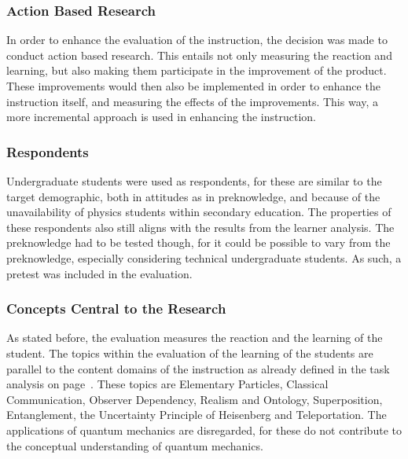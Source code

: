 \documentclass[11pt,twoside]{report} %
\begin{document}
\subsubsection{Action Based Research}

In order to enhance the evaluation of the instruction, the decision was made to conduct action based research. This entails not only measuring the reaction and learning, but also making them participate in the improvement of the product. These improvements would then also be implemented in order to enhance the instruction itself, and measuring the effects of the improvements. This way, a more incremental approach is used in enhancing the instruction.

\subsubsection{Respondents}

Undergraduate students were used as respondents, for these are similar to the target demographic, both in attitudes as in preknowledge, and because of the unavailability of physics students within secondary education. The properties of these respondents also still aligns with the results from the learner analysis. The preknowledge had to be tested though, for it could be possible to vary from the preknowledge, especially considering technical undergraduate students. As such, a pretest was included in the evaluation.

\subsubsection{Concepts Central to the Research}
\label{sssec:evaconcepts}

As stated before, the evaluation measures the reaction and the learning of the student. The topics within the evaluation of the learning of the students are parallel to the content domains of the instruction as already defined in the task analysis on page~\pageref{ch:taskanalysis}. These topics are Elementary Particles, Classical Communication, Observer Dependency, Realism and Ontology, Superposition, Entanglement, the Uncertainty Principle of Heisenberg and Teleportation. The applications of quantum mechanics are disregarded, for these do not contribute to the conceptual understanding of quantum mechanics.
\end{document}

